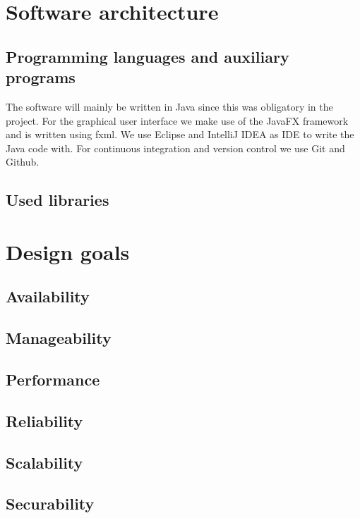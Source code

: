 \documentclass[a4paper]{article}
\begin{document}
\section{Software architecture}

\subsection{Programming languages and auxiliary programs}
The software will mainly be written in Java since this was obligatory in
the project. For the graphical user interface we make use of the JavaFX
framework and is written using fxml. We use Eclipse and IntelliJ IDEA as IDE to
write the Java code with. For continuous integration and version control we use
Git and Github. 

\subsection{Used libraries}

\section{Design goals}

\subsection{Availability}

\subsection{Manageability}

\subsection{Performance}

\subsection{Reliability}

\subsection{Scalability}

\subsection{Securability}
\end{document}
